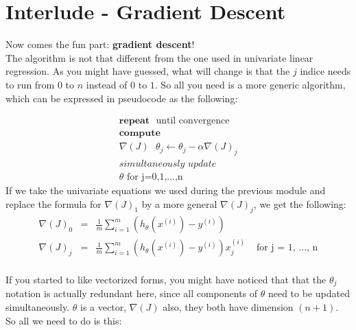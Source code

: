 
\section*{Interlude - Gradient Descent}

Now comes the fun part: \textbf{gradient descent}!\\
\newline
The algorithm is not that different from the one used in univariate 
linear regression. As you might have guessed, what will change is 
that the $j$ indice needs to run from $0$ to $n$ instead of $0$ 
to $1$. So all you need is a more generic algorithm, which can be 
expressed in pseudocode as the following:

$$ 
\begin{matrix}
\textbf{repeat} \text{ } \text{until convergence} \\
\textbf{compute} \\
\nabla{(J)} \text{ } \theta_j \gets \theta_j - \alpha \nabla(J)_j \\
\textit{simultaneously update} \\
\theta \text{ for j=0,1,...,n}
\end{matrix}
$$
If we take the univariate equations we used during the previous module and replace the formula for $\nabla(J)_1$ by a more general $\nabla(J)_j$, we get the following:\\
\newline
$$
\begin{matrix}
\nabla(J)_0 &  = &\frac{1}{m}\sum_{i=1}^{m}(h_{\theta}(x^{(i)}) - y^{(i)}) & \\
\nabla(J)_j & = &\frac{1}{m}\sum_{i=1}^{m}(h_{\theta}(x^{(i)}) - y^{(i)})x_{j}^{(i)} & \text{ for j = 1, ..., n}    
\end{matrix}
$$
\\
If you started to like vectorized forms, you might have noticed that that the $\theta_j$ notation is actually redundant here, since all components of $\theta$ need to be updated simultaneously. $\theta$ is a vector, $\nabla{(J)}$ also, they both have dimension $(n+1)$. So all we need to do is this:


